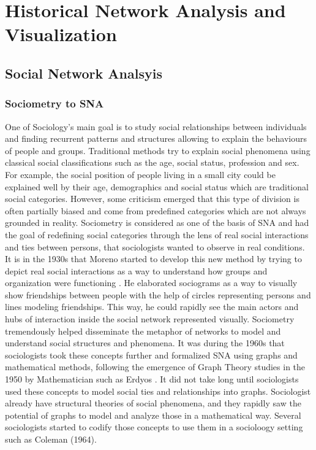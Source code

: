 
\chapter{Historical Network Analysis and Visualization}



\section{Social Network Analsyis}


\subsection{Sociometry to SNA}

One of Sociology's main goal is to study social relationships between individuals and finding recurrent patterns and structures allowing to explain the behaviours of people and groups.
Traditional methods try to explain social phenomena using classical social classifications such as the age, social status, profession and sex.
For example, the social position of people living in a small city could be explained well by their age, demographics and social status which are traditional social categories.
However, some criticism emerged that this type of division is often partially biased and come from predefined categories which are not always grounded in reality.
Sociometry is considered as one of the basis of SNA and had the goal of redefining social categories through the lens of real social interactions and ties between persons, that sociologists wanted to observe in real conditions.
It is in the 1930s that Moreno started to develop this new method by trying to depict real social interactions as a way to understand how groups and organization were functioning \cite{morenoFoundationsSociometryIntroduction1941}.
He elaborated sociograms as a way to visually show friendships between people with the help of circles representing persons and lines modeling friendships.
This way, he could rapidly see the main actors and hubs of interaction inside the social network represented visually.
Sociometry tremendously helped disseminate the metaphor of networks to model and understand social structures and phenomena.
It was during the 1960s that sociologists took these concepts further and formalized SNA using graphs and mathematical methods, following the emergence of Graph Theory studies in the 1950 by Mathematician such as Erdyos .
It did not take long until sociologists used these concepts to model social ties and relationships into graphs. Sociologist already have structural theories of social phenomena, and they rapidly saw the potential of graphs to model and analyze those in a mathematical way. Several sociologists started to codify those concepts to use them in a socioloogy setting such as Coleman (1964).
